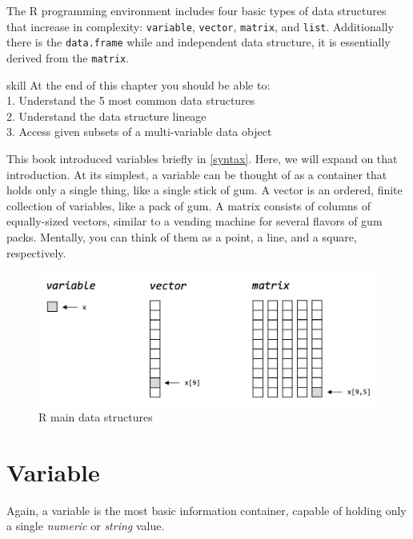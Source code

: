 \documentclass[
]{book}
\begin{document}
The R programming environment includes four basic types of data structures that increase in complexity: \texttt{variable}, \texttt{vector}, \texttt{matrix}, and \texttt{list}. Additionally there is the \texttt{data.frame} while and independent data structure, it is essentially derived from the \texttt{matrix}.

\begin{infobox}{skill}
At the end of this chapter you should be able to:\\
1. Understand the 5 most common data structures\\
2. Understand the data structure lineage\\
3. Access given subsets of a multi-variable data object\\


\end{infobox}

\hfill\break
This book introduced variables briefly in \ref{syntax}. Here, we will expand on that introduction. At its simplest, a variable can be thought of as a container that holds only a single thing, like a single stick of gum. A vector is an ordered, finite collection of variables, like a pack of gum. A matrix consists of columns of equally-sized vectors, similar to a vending machine for several flavors of gum packs. Mentally, you can think of them as a point, a line, and a square, respectively.

\begin{figure}

{\centering \includegraphics[width=0.67\linewidth]{images/04_001_data_structures} 

}

\caption{\label{fig:4001}R main data structures}\label{fig:4001}
\end{figure}

\hypertarget{variable}{%
\section{Variable}\label{variable}}

Again, a variable is the most basic information container, capable of
holding only a single \emph{numeric} or \emph{string} value.
\end{document}
